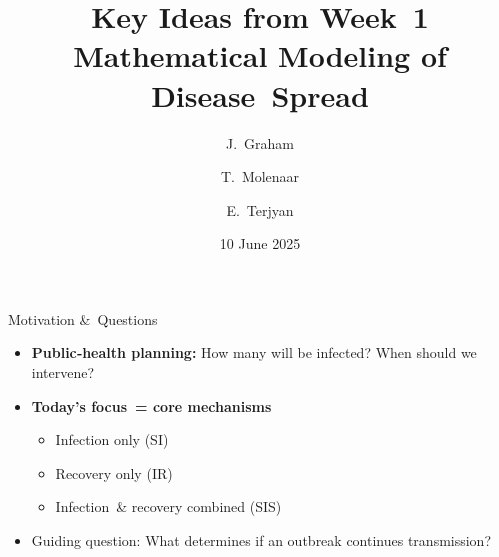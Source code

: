 \documentclass[14pt,aspectratio=169]{beamer}
\title[Modeling Disease Spread]{Key Ideas from Week 1\\Mathematical Modeling of Disease Spread}
\author{J.~Graham \and T.~Molenaar \and E.~Terjyan}
\institute[VU Amsterdam]{%
  Vrije University\
  of Amsterdam \\
  Dynamical Systems Project
}\date{10 June 2025}
\begin{document}
\begin{frame}[plain]
  \titlepage
\end{frame}

\begin{frame}{Motivation \& Questions}
  \begin{itemize}
    \item \textbf{Public‑health planning:} How many will be infected? When should we intervene?
    \item \textbf{Today’s focus = core mechanisms}
      \begin{itemize}
        \item Infection only (\alert{SI})
        \item Recovery only (\alert{IR})
        \item Infection \& recovery combined (\alert{SIS})
      \end{itemize}
    \item Guiding question: \alert{What determines if an outbreak continues transmission?}
  \end{itemize}
\end{frame}
\end{document}
